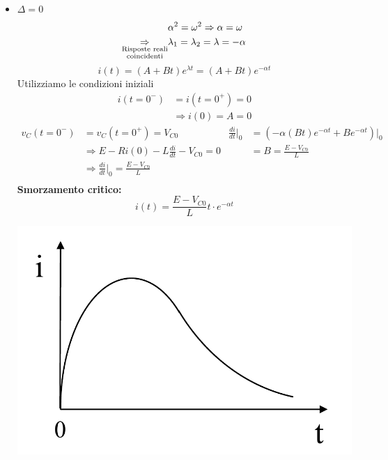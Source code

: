 \documentclass{article}
\begin{document}
\begin{itemize}
        \item $\Delta = 0$
        \begin{align*}
            &\alpha^2 = \omega^2 \Rightarrow \alpha = \omega\\
            \underset{\substack{\text{Risposte reali} \\ \text{coincidenti}}}{\Rightarrow} &\lambda_1 = \lambda_2 = \lambda = - \alpha
        \end{align*}
        \[i(t) = \left(A+Bt\right)e^{\lambda t} = \left(A+Bt\right)e^{-\alpha t}\]
        Utilizziamo le condizioni iniziali
        \begin{align*}
            i(t=0^-) &= i(t=0^+) = 0\\
            &\Rightarrow i(0) = A = 0
        \end{align*}
        \begin{align*}
            v_C(t=0^-) &= v_C(t=0^+) = V_{C0} & \frac{di}{dt} \bigg|_0 &= \left(-\alpha(Bt)e^{-\alpha t} + Be^{- \alpha t}\right)\big|_0\\
            &\Rightarrow E - Ri(0) - L\frac{di}{dt} - V_{C0} = 0 & &= B = \frac{E-V_{C0}}{L} \\
            &\Rightarrow \frac{di}{dt} \bigg|_0 = \frac{E-V_{C0}}{L}\\
        \end{align*}
        \textbf{Smorzamento critico:}
        \[i(t) = \frac{E-V_{C0}}{L}t \cdot e^{- \alpha t}\]
        \begin{center}
            \includegraphics[scale=0.3]{Image/RLC_3.png}
        \end{center}


\end{itemize}
\end{document}
